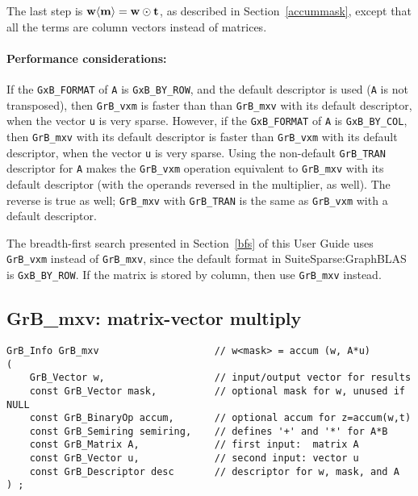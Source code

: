 \documentclass[12pt]{article}
\begin{document}
The last step is ${\bf w \langle m \rangle  = w \odot t}$, as described
in Section~\ref{accummask}, except that all the
terms are column vectors instead of matrices.

\paragraph{\bf Performance considerations:} %
If the \verb'GxB_FORMAT' of \verb'A' is \verb'GxB_BY_ROW', and the default
descriptor is used (\verb'A' is not transposed), then \verb'GrB_vxm' is faster
than than \verb'GrB_mxv' with its default descriptor, when the vector \verb'u'
is very sparse.
However, if the \verb'GxB_FORMAT' of \verb'A' is \verb'GxB_BY_COL', then
\verb'GrB_mxv' with its default descriptor is faster than \verb'GrB_vxm' with
its default descriptor, when the vector \verb'u' is very sparse.
Using the non-default \verb'GrB_TRAN' descriptor for \verb'A' makes the
\verb'GrB_vxm' operation equivalent to \verb'GrB_mxv' with its default
descriptor (with the operands reversed in the multiplier, as well).  The
reverse is true as well; \verb'GrB_mxv' with \verb'GrB_TRAN' is the same as
\verb'GrB_vxm' with a default descriptor.

The breadth-first search presented in Section~\ref{bfs} of this User Guide uses
\verb'GrB_vxm' instead of \verb'GrB_mxv', since the default format in
SuiteSparse:GraphBLAS is \verb'GxB_BY_ROW'.  If the matrix is stored by column,
then use \verb'GrB_mxv' instead.

\newpage
\subsection{{\sf GrB\_mxv:} matrix-vector multiply} %
\label{mxv}

\begin{mdframed}[userdefinedwidth=6in]
{\footnotesize
\begin{verbatim}
GrB_Info GrB_mxv                    // w<mask> = accum (w, A*u)
(
    GrB_Vector w,                   // input/output vector for results
    const GrB_Vector mask,          // optional mask for w, unused if NULL
    const GrB_BinaryOp accum,       // optional accum for z=accum(w,t)
    const GrB_Semiring semiring,    // defines '+' and '*' for A*B
    const GrB_Matrix A,             // first input:  matrix A
    const GrB_Vector u,             // second input: vector u
    const GrB_Descriptor desc       // descriptor for w, mask, and A
) ;
\end{verbatim} } \end{mdframed}
\end{document}
